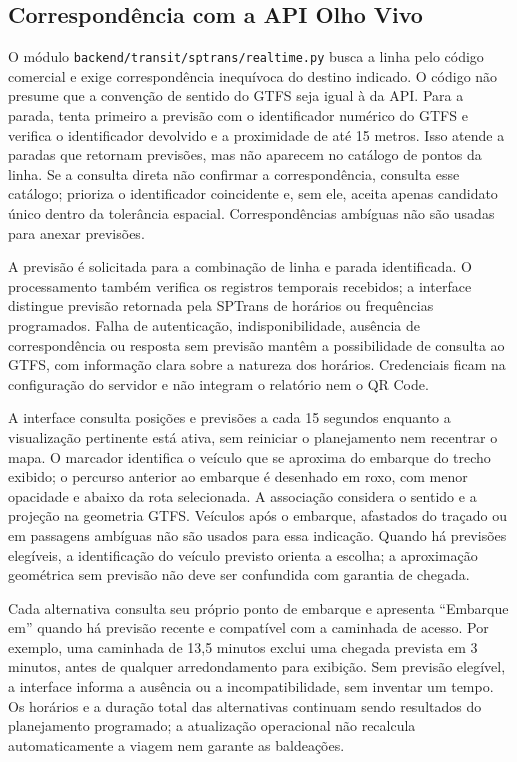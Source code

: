 \documentclass[12pt,oneside,a4paper,brazil,chapter=TITLE]{abntex2}
\let\papsection\section
\renewcommand{\section}{\clearpage\papsection}
\begin{document}
\begin{apendicesenv}
\section{Correspondência com a API Olho Vivo}
O módulo \nolinkurl{backend/transit/sptrans/realtime.py} busca a linha pelo código comercial e exige correspondência inequívoca do destino indicado. O código não presume que a convenção de sentido do GTFS seja igual à da API. Para a parada, tenta primeiro a previsão com o identificador numérico do GTFS e verifica o identificador devolvido e a proximidade de até 15 metros. Isso atende a paradas que retornam previsões, mas não aparecem no catálogo de pontos da linha. Se a consulta direta não confirmar a correspondência, consulta esse catálogo; prioriza o identificador coincidente e, sem ele, aceita apenas candidato único dentro da tolerância espacial. Correspondências ambíguas não são usadas para anexar previsões.

A previsão é solicitada para a combinação de linha e parada identificada. O processamento também verifica os registros temporais recebidos; a interface distingue previsão retornada pela SPTrans de horários ou frequências programados. Falha de autenticação, indisponibilidade, ausência de correspondência ou resposta sem previsão mantêm a possibilidade de consulta ao GTFS, com informação clara sobre a natureza dos horários. Credenciais ficam na configuração do servidor e não integram o relatório nem o QR Code.

A interface consulta posições e previsões a cada 15 segundos enquanto a visualização pertinente está ativa, sem reiniciar o planejamento nem recentrar o mapa. O marcador identifica o veículo que se aproxima do embarque do trecho exibido; o percurso anterior ao embarque é desenhado em roxo, com menor opacidade e abaixo da rota selecionada. A associação considera o sentido e a projeção na geometria GTFS. Veículos após o embarque, afastados do traçado ou em passagens ambíguas não são usados para essa indicação. Quando há previsões elegíveis, a identificação do veículo previsto orienta a escolha; a aproximação geométrica sem previsão não deve ser confundida com garantia de chegada.

Cada alternativa consulta seu próprio ponto de embarque e apresenta ``Embarque em'' quando há previsão recente e compatível com a caminhada de acesso. Por exemplo, uma caminhada de 13,5 minutos exclui uma chegada prevista em 3 minutos, antes de qualquer arredondamento para exibição. Sem previsão elegível, a interface informa a ausência ou a incompatibilidade, sem inventar um tempo. Os horários e a duração total das alternativas continuam sendo resultados do planejamento programado; a atualização operacional não recalcula automaticamente a viagem nem garante as baldeações.


\end{apendicesenv}
\end{document}
